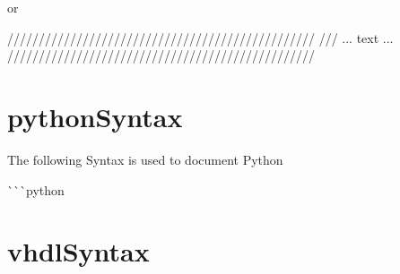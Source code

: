 or 
\begin{DoxyCode}
/////////////////////////////////////////////////
/// ... text ...
/////////////////////////////////////////////////
\end{DoxyCode}
 \hypertarget{pythonSyntax}{}\section{python\+Syntax}\label{pythonSyntax}
The following Syntax is used to document Python

\`{}\`{}\`{}python \subsection*{}\hypertarget{vhdlSyntax}{}\section{vhdl\+Syntax}\label{vhdlSyntax}
